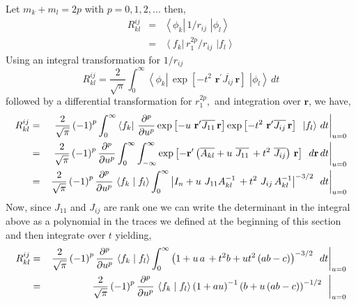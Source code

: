 \documentclass[12pt,doublespace]{article}
\begin{document}
Let $m_{k}+m_{l}=2p$ with $p=0,1,2,...$ then, 
\begin{eqnarray}
R_{kl}^{ij} &=&\left\langle \phi _{k}\right| \,1/r_{ij}\,\mathbf{\,}\left|
\phi _{l}\right\rangle \\
&=&\left\langle f_{k}\right| \,r_{1}^{2p}/r_{ij}\,\mathbf{\,}\left|
f_{l}\right\rangle
\end{eqnarray}
Using an integral transformation for $1/r_{ij}$%
\begin{equation}
R_{kl}^{ij}=\frac{2}{\sqrt{\pi }}\int_{0}^{\infty }\left\langle \phi
_{k}\right| \,\exp \left[ -t^{2}\,\,\mathbf{r}^{\prime }\overline{J_{ij}}\,%
\mathbf{r}\right] \,\mathbf{\,}\left| \phi _{l}\right\rangle \,dt
\end{equation}
followed by a differential transformation for $r_{1}^{2p},$ and integration
over $\mathbf{r}$, we have, 
\begin{eqnarray}
R_{kl}^{ij} &=&\left. \frac{2}{\sqrt{\pi }}\left( -1\right)
^{p}\int_{0}^{\infty }\left\langle f_{k}\right| \,\frac{\partial ^{p}}{%
\partial u^{p}}\exp \left[ -u\,\,\mathbf{r}^{\prime }\overline{J_{11}}\,%
\mathbf{r}\right] \exp \left[ -t^{2}\,\,\mathbf{r}^{\prime }\overline{J_{ij}}%
\,\mathbf{r}\right] \,\mathbf{\,}\left| f_{l}\right\rangle \,dt\right| _{u=0}
\\
&=&\left. \frac{2}{\sqrt{\pi }}\left( -1\right) ^{p}\frac{\partial ^{p}}{%
\partial u^{p}}\int_{0}^{\infty }\int_{-\infty }^{\infty }\exp \left[ -%
\mathbf{r}^{\prime }\left( \overline{A_{kl}}+u\,\,\overline{J_{11}}%
\,+t^{2}\,\,\overline{J_{ij}}\right) \,\mathbf{r}\right] \,\mathbf{\,}\,d%
\mathbf{r}\,dt\right| _{u=0} \\
&=&\left. \frac{2}{\sqrt{\pi }}\left( -1\right) ^{p}\frac{\partial ^{p}}{%
\partial u^{p}}\,\left\langle f_{k}\right. |\left. f_{l}\right\rangle
\int_{0}^{\infty }\left|
I_{n}+u\,\,J_{11}A_{kl}^{-1}\,+t^{2}\,\,J_{ij}\,A_{kl}^{-1}\right| ^{-3/2}%
\mathbf{\,}\,\,dt\right| _{u=0}
\end{eqnarray}
Now, since $J_{11}$ and $J_{ij}$ are rank one we can write the determinant
in the integral above as a polynomial in the traces we defined at the
beginning of this section and then integrate over $t$ yielding, 
\begin{eqnarray}
R_{kl}^{ij} &=&\left. \frac{2}{\sqrt{\pi }}\left( -1\right) ^{p}\frac{%
\partial ^{p}}{\partial u^{p}}\,\left\langle f_{k}\right. |\left.
f_{l}\right\rangle \int_{0}^{\infty }\left( 1+u\,a\,+t^{2}b+ut^{2}\left(
ab-c\right) \right) ^{-3/2}\mathbf{\,}\,\,dt\right| _{u=0} \\
&=&\left. \frac{2}{\sqrt{\pi }}\left( -1\right) ^{p}\frac{\partial ^{p}}{%
\partial u^{p}}\,\left\langle f_{k}\right. |\left. f_{l}\right\rangle \left(
1+au\right) ^{-1}\left( b+u\left( ab-c\right) \right) ^{-1/2}\mathbf{\,}%
\,\,\right| _{u=0}
\end{eqnarray}
\end{document}

